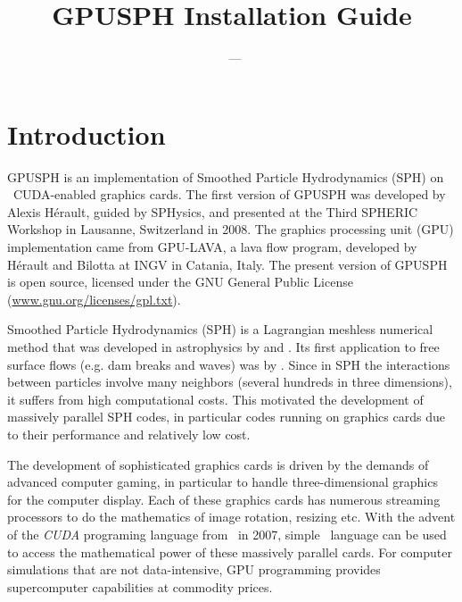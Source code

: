\documentclass{../GPUSPHtemplate}
\title{GPUSPH Installation Guide}
\author{}
\date{\currentver\ --- \reldate}
\begin{document}
\maketitle
\tableofcontents
\newpage

\section{Introduction}

GPUSPH is an implementation of Smoothed Particle Hydrodynamics (SPH) on
\nvidia\ CUDA-enabled graphics cards. The first version of GPUSPH was
developed by Alexis Hérault, guided by SPHysics, and presented at the
Third SPHERIC Workshop in Lausanne, Switzerland in 2008. 
The graphics processing unit (GPU) implementation came from GPU-LAVA, 
a lava flow program, developed by Hérault and Bilotta at INGV in 
Catania, Italy. The present version of GPUSPH is open source, 
licensed under the GNU General Public License
(\url{www.gnu.org/licenses/gpl.txt}).

Smoothed Particle Hydrodynamics (SPH) is a Lagrangian meshless numerical
method that was developed in astrophysics by \cite{lucy_numerical_1977} and
\cite{gingold_smoothed_1977}. Its first application to free surface flows (e.g.
dam breaks and waves) was by \cite{monaghan_volcanoes_1994}.
Since in SPH the interactions between particles involve many neighbors
(several hundreds in three dimensions), it suffers from high computational costs.
This motivated the development of massively parallel SPH codes,
in particular codes running on graphics cards due to their performance and relatively
low cost.

The development of sophisticated graphics cards is driven by the demands of 
advanced computer gaming, in particular to handle three-dimensional 
graphics for the computer display. Each of these
graphics cards has numerous streaming processors to do the mathematics
of image rotation, resizing etc. With the advent of the {\em CUDA}
programing language from \nvidia\ in 2007, simple \cpp\ language can be used
to access the mathematical power of these massively parallel cards. For
computer simulations that are not data-intensive, GPU programming
provides supercomputer capabilities at commodity prices.
\end{document}
